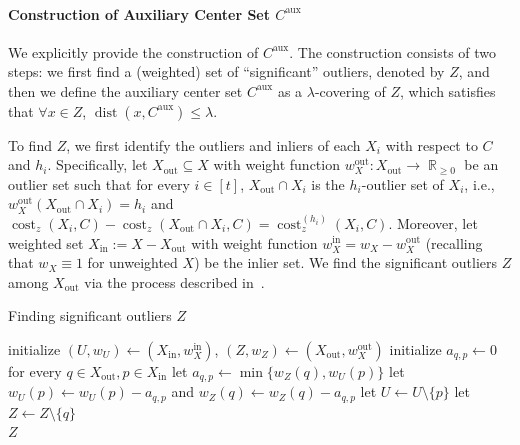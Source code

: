 \documentclass[letterpaper,11pt]{article}
\theoremstyle{plain}
\theoremstyle{definition}
\theoremstyle{remark}
\DeclareMathOperator{\R}{\mathbb{R}}
\DeclareMathOperator{\cost}{cost}
\DeclareMathOperator{\dist}{dist}
\newcommand{\inl}{\mathrm{in}}
\newcommand{\out}{\mathrm{out}}
\newcommand{\aux}{\mathrm{aux}}
\begin{document}
\paragraph{Construction of Auxiliary Center Set $C^\aux$}
We explicitly provide the construction of $C^\aux$.
The construction consists of two steps: we first find a (weighted) set of ``significant'' outliers, denoted by $Z$, and then we define the auxiliary center set $C^\aux$ as a $\lambda$-covering of $Z$, which satisfies that $\forall x\in Z$, $\dist(x,C^\aux)\le\lambda$.



To find $Z$, we first identify the outliers and inliers of each $X_i$ with respect to $C$ and $h_i$. Specifically, let $X_\out \subseteq X$ with weight function $w_X^\out:X_\out\to\R_{\ge 0}$ be an outlier set such that for every $i \in [t]$, $X_\out\cap X_i$ is the $h_i$-outlier set of $X_i$, i.e., $w_X^{\out}(X_\out \cap X_i) = h_i$ and $\cost_z(X_i,C) - \cost_z(X_\out \cap X_i,C) = \cost_z^{(h_i)}(X_i,C)$. Moreover, let weighted set $X_\inl := X - X_\out$ with weight function $w_X^\inl = w_X-w_X^\out$ (recalling that $w_X\equiv 1$ for unweighted $X$) be the inlier set. We find the significant outliers $Z$ among $X_\out$ via the process described in~. 

\begin{algorithm}[ht]
    \caption{Finding significant outliers $Z$}
    \label{alg:additional centers}
    \begin{algorithmic}[1] 
\State initialize $(U,w_U)\gets (X_\inl,w_X^\inl)$, $(Z,w_Z)\gets (X_\out, w_X^\out)$ 
        \State initialize $a_{q,p}\gets 0$ for every $q\in X_\out,p\in X_\inl$
        \While{$\exists q\in Z, p\in U$ s.t. $\dist(p,q)\le \dist(p,C) + 4\lambda$}
            \State let $a_{q,p}\gets \min\{w_Z(q), w_U(p) \}$
            \label{alg line:allocate}  
            \State let $w_U(p)\gets w_U(p) - a_{q,p}$ and $w_Z(q)\gets w_Z(q) - a_{q,p}$
                \State let $U\gets U\setminus \{p\}$
            \EndIf
                \State let $Z\gets Z\setminus \{q\}$
            \EndIf
        \EndWhile
        \\
        \Return $Z$
    \end{algorithmic}
\end{algorithm}
\end{document}
